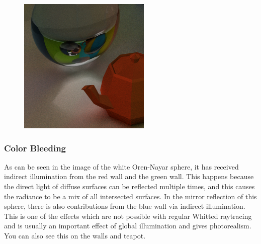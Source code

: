 \documentclass[a4paper, twocolumn]{article}
\begin{document}
            \begin{figure}[H]
                \centering
                \includegraphics[width=0.8\linewidth]{share/new_render_caustics.png}
                \label{fig:render_caustics}
            \end{figure}

            \vspace{-5em}

            \subsubsection*{Color Bleeding}

            As can be seen in the image of the white Oren-Nayar sphere, it has received indirect illumination from the red wall and the green wall. This happens because the direct light of diffuse surfaces can be reflected multiple times, and this causes the radiance to be a mix of all intersected surfaces. In the mirror reflection of this sphere, there is also contributions from the blue wall via indirect illumination. This is one of the effects which are not possible with regular Whitted raytracing and is usually an important effect of global illumination and gives photorealism. You can also see this on the walls and teapot.
\end{document}
